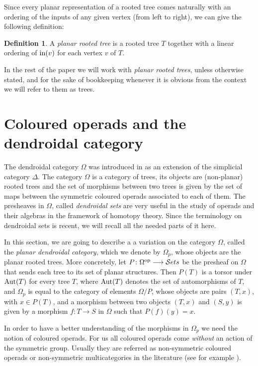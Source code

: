 \documentclass[a4paper]{amsart}
\theoremstyle{plain}
\theoremstyle{definition}
\newtheorem{dfn}[thm]{Definition}
\theoremstyle{remark}
\newcommand{\rpd}{\Omega_p}
\numberwithin{equation}{section}
\numberwithin{figure}{section}
\begin{document}
Since every planar representation of a rooted tree
comes naturally with an ordering of the inputs of any given vertex
(from left to right), we can give the following definition:

\begin{dfn}
    A \emph{planar rooted tree} is a rooted tree $T$ together with a linear ordering of
    $\operatorname{in}(v)$ for each vertex $v$ of $T$.
\end{dfn}

In the rest of the paper we will work with \emph{planar rooted trees}, unless otherwise stated, and for the sake of
bookkeeping whenever it is obvious from the context we will refer to them as trees.

\section{Coloured operads and the dendroidal category}
The dendroidal category $\Omega$ was introduced in \cite{Wei07,
    moerdijkweiss} as an extension of the simplicial category $\Delta$.
The category $\Omega$ is a category of trees, its objects are
(non-planar) rooted trees and the set of morphisms between two trees
is given by the set of maps between the symmetric coloured operads
associated to each of them. The presheaves in $\Omega$, called
\emph{dendroidal sets} are very useful in the study of operads and
their algebras in the framework of homotopy theory. Since the
terminology on dendroidal sets is  recent, we will recall all the
needed parts of it here.

In this section, we are going to describe a a variation on the
category $\Omega$, called the \emph{planar dendroidal category},
which we denote by $\rpd$, whose objects are the planar rooted
trees. More concretely, let $P\colon \Omega^{\rm op}\longrightarrow
    \mathcal{S}ets$ be the presheaf on $\Omega$ that sends each tree to
its set of planar structures. Then $P(T)$ is a torsor under ${\rm
            Aut}(T)$ for every tree $T$, where ${\rm Aut}(T)$ denotes the set of
automorphisms of $T$, and $\rpd$ is equal to the category of
elements $\Omega/P$, whose objects are pairs $(T, x)$, with $x\in
    P(T)$, and a morphism between two objects $(T,x)$ and $(S,y)$ is
given by a morphism $f\colon T\longrightarrow S$ in $\Omega$ such
that $P(f)(y)=x$.

In order to have a better understanding of the morphisms in $\rpd$ we need the notion of
coloured operads. For us all coloured operads come \emph{without} an
action of the symmetric group. Usually they are referred as
non-symmetric coloured operads or non-symmetric multicategories in
the literature (see for example \cite{bergermoerdijk, markl}).
\end{document}
